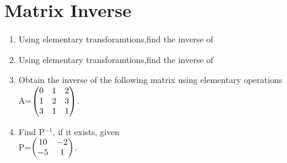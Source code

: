 \documentclass[journal,12pt,twocolumn]{IEEEtran}
\renewcommand\thesection{\arabic{section}}
\begin{document}
\section{Matrix Inverse}
\renewcommand{\theequation}{\theenumi}
\begin{enumerate}[label=\thesection.\arabic*.,ref=\thesection.\theenumi]
\item Using elementary transforamtions,find the inverse of   
\\
  \solution
%  
\item Using elementary transforamtions,find the inverse of   
   \\
  \solution
%  
\item Obtain the inverse of the following matrix using elementary operations\\
  A=$\begin{pmatrix} 0 &1 &2\\1 &2 &3\\3 &1 &1\end{pmatrix}$.\\
  \solution
    \item Find P$^{-1}$, if it exists, given \\
    P=$\begin{pmatrix} 10 &-2\\-5 &1\end{pmatrix}$.\\
    \solution
%    

\end{enumerate}
\end{document}
